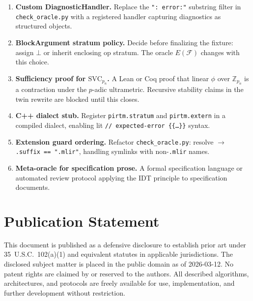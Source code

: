 \documentclass[11pt,letterpaper]{article}
\theoremstyle{pirtmthm}
\theoremstyle{remark}
\begin{document}
\begin{enumerate}[leftmargin=1.8em,itemsep=4pt]
  \item \textbf{Custom DiagnosticHandler.}
    Replace the \texttt{": error:"} substring filter in \texttt{check\_oracle.py}
    with a registered handler capturing diagnostics as structured objects.

  \item \textbf{BlockArgument stratum policy.}
    Decide before finalizing the fixture: assign $\bot$ or inherit enclosing
    op stratum.
    The oracle $E(\mathcal{F})$ changes with this choice.

  \item \textbf{Sufficiency proof for $\mathrm{SVC}_{p_n}$.}
    A Lean or Coq proof that linear $\phi$ over $\mathbb{Z}_{p_n}$ is a
    contraction under the $p$-adic ultrametric.
    Recursive stability claims in the twin rewrite are blocked until this closes.

  \item \textbf{C++ dialect stub.}
    Register \texttt{pirtm.stratum} and \texttt{pirtm.extern} in a compiled
    dialect, enabling lit \texttt{//~expected-error~\{\{\ldots\}\}} syntax.

  \item \textbf{Extension guard ordering.}
    Refactor \texttt{check\_oracle.py}: resolve $\to$ \texttt{.suffix~==~".mlir"},
    handling symlinks with non-\texttt{.mlir} names.

  \item \textbf{Meta-oracle for specification prose.}
    A formal specification language or automated review protocol applying the
    IDT principle to specification documents.
\end{enumerate}

\section{Publication Statement}

This document is published as a defensive disclosure to establish prior art
under 35~U.S.C.~102(a)(1) and equivalent statutes in applicable jurisdictions.
The disclosed subject matter is placed in the public domain as of 2026-03-12.
No patent rights are claimed by or reserved to the authors.
All described algorithms, architectures, and protocols are freely available
for use, implementation, and further development without restriction.
\end{document}
